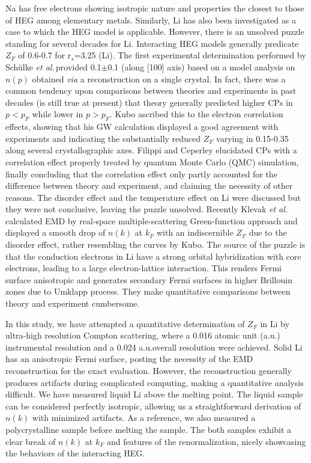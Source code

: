 \documentclass[twocolumn,showpacs,showkeys,fleqn,prl,superscriptaddress]{revtex4}%
\newcommand{\ii}[1]{\textit{#1}}
\begin{document}
Na has free electrons showing isotropic nature and properties the closest to those of HEG among elementary metals.
Similarly, Li has also been investigated as a case to which the HEG model is applicable.
However, there is an unsolved puzzle standing for several decades for Li. 
Interacting HEG models generally predicate $Z_F$ of 0.6-0.7 for r$_s$=3.25 (Li).
The first experimental determination performed by Sch{\"u}lke \ii{et al.}\,provided 0.1$\pm$0.1 (along [100] axis) based on a model analysis on $n(p)$ obtained \ii{via} a reconstruction on a single crystal\cite{schulke96}. 
In fact, there was a common tendency upon comparisons between theories and experiments in past decades (is still true at present) that theory generally predicted higher CPs in $p<p_F$ while lower in $p>p_F$\cite{saku95}. 
Kubo ascribed this to the electron correlation effects, showing that his GW calculation displayed a good agreement with experiments and indicating the substantially reduced $Z_F$ varying in 0.15-0.35 along several crystallographic axes\cite{kubo95,kubo97}.
Filippi and Ceperley elucidated CPs with a correlation effect properly treated by quantum Monte Carlo (QMC) simulation, finally concluding that the correlation effect only partly accounted for the difference between theory and experiment, and claiming the necessity of other reasons\cite{filippi99}.  
The disorder effect\cite{dugdale98} and the temperature effect on Li\cite{stern01} were discussed but they were not conclusive, leaving the puzzle unsolved.
Recently Klevak \ii{et al.}\,calculated EMD by real-space multiple-scattering Green-function approach and displayed a smooth drop of $n(k)$ at $k_F$ with an indiscernible $Z_F$ due to the disorder effect, rather resembling the curves by Kubo\cite{klevak16}.  
The source of the puzzle is that the conduction electrons in Li have a strong orbital hybridization with core electrons, leading to a large electron-lattice interaction.
This renders Fermi surface anisotropic and generates secondary Fermi surfaces in higher Brillouin zones due to Umklapp process.
They make quantitative comparisons between theory and experiment cumbersome. 

In this study, we have attempted a quantitative determination of $Z_F$ in Li by ultra-high resolution Compton scattering, where a 0.016 atomic unit (a.u.) instrumental resolution and a 0.024 a.u.\;overall resolution were achieved.
Solid Li has an anisotropic Fermi surface, posting the necessity of the EMD reconstruction for the exact evaluation. 
However, the reconstruction generally produces artifacts during complicated computing, making a quantitative analysis difficult.
We have measured liquid Li above the melting point.
The liquid sample can be considered perfectly isotropic, allowing us a straightforward derivation of $n(k)$ with minimized artifacts.
As a reference, we also measured a polycrystalline sample before melting the sample.
The both samples exhibit a clear break of $n(k)$ at $k_F$ and features of the renormalization, nicely showcasing the behaviors of the interacting HEG\cite{holz11}.
\end{document}
